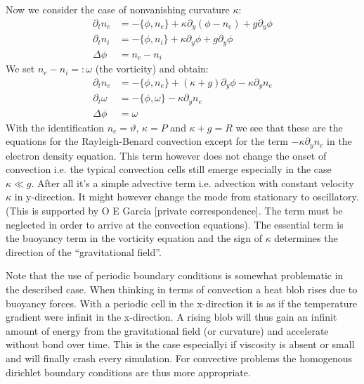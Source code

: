 \documentclass[a4paper,12pt]{scrartcl}
\begin{document}
Now we consider the case of nonvanishing curvature $\kappa$:
\begin{subequations}
\begin{align}
    \partial_t n_e &= -\{\phi,n_e\} +\kappa\partial_y(\phi - n_e)  + g\partial_y\phi \\
    \partial_t n_i &= -\{\phi,n_i\} +\kappa\partial_y\phi  + g\partial_y\phi \\
    \Delta\phi &= n_e - n_i
\end{align}
\label{eq:toefl_pre_rb}
\end{subequations}
We set $n_e - n_i =: \omega$ (the vorticity) and obtain:
\begin{subequations}
\begin{align}
    \partial_t n_e &= -\{\phi,n_e\} +(\kappa+g)\partial_y\phi - \kappa\partial_y n_e \\
    \partial_t \omega &=-\{\phi, \omega\} -\kappa \partial_y n_e \\
    \Delta\phi &= \omega 
\end{align}
\label{eq:toefl_rb}
\end{subequations}
With the identification $n_e = \vartheta$, $\kappa = P$ and $\kappa+g=R$ we see that these are
the equations for the Rayleigh-Benard convection except for the term 
$-\kappa\partial_y n_e$
in the electron density equation. 
This term however does not change the onset of convection i.e. the 
typical convection cells still emerge especially in the case $\kappa \ll g$. 
After all it's a simple advective term 
i.e. advection with constant velocity $\kappa$ in y-direction. It might
however change the mode from stationary to oscillatory. (This is
supported by O E Garcia [private correspondence]. The term must be neglected
in order to arrive at the convection equations).
The essential term is the buoyancy term in the vorticity equation and the
sign of $\kappa$ determines the direction of the ``gravitational field''. 

Note that the use of periodic boundary conditions is somewhat problematic in 
the described case. When thinking in terms of convection a heat blob rises due to
buoyancy forces. With a periodic cell in the x-direction it is as if the 
temperature gradient were infinit in the x-direction. A rising blob will thus
gain an infinit amount of energy from the gravitational field (or curvature)
and accelerate without bond over time. 
This is the case especiallyi if viscosity is absent or small and will finally 
crash every simulation.
For convective problems the homogenous dirichlet boundary conditions are thus more 
appropriate.







\end{document}
